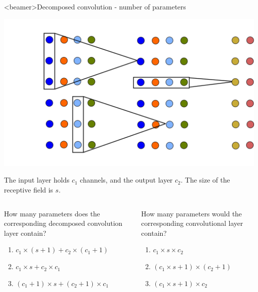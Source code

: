 \documentclass[xcolor=pdftex,dvipsnames,table,mathserif]{beamer}
\begin{document}
\begin{frame}<beamer>{Decomposed convolution - number of parameters}
    \scriptsize

  \begin{center}
    \includegraphics[height=0.30\textheight]{conv_dec.png}
  \end{center}

  The input layer holds $c_1$ channels, and the output layer $c_2$. The size of the receptive field is $s$.

  \begin{columns}
  \begin{column}{.5\textwidth}

    \begin{quizzblock}{}
    How many parameters does the corresponding decomposed convolution layer contain?

\begin{enumerate}
\item \alert{$c_1 \times (s + 1) + c_2 \times (c_1 + 1)$}
\item $c_1 \times s + c_2 \times c_1 $
\item $(c_1 + 1) \times s  + (c_2 + 1) \times c_1 $
\end{enumerate}

    \end{quizzblock}

  \end{column}

  \begin{column}{.5\textwidth}

    \begin{quizzblock}{}
How many parameters would the corresponding convolutional layer contain?

\begin{enumerate}
\item $c_1 \times s  \times c_2$
\item $(c_1 \times s + 1) \times (c_2 + 1)$
\item \alert{$(c_1 \times s + 1) \times c_2$}
\end{enumerate}

    \end{quizzblock}

  \end{column}
\end{columns}



\end{frame}
\end{document}
